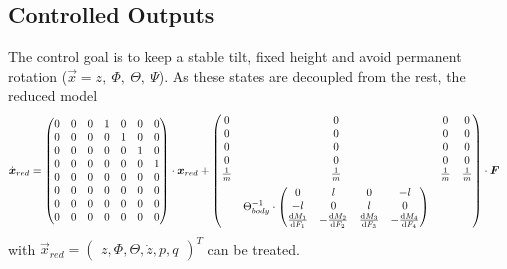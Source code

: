 \subsection{Controlled Outputs}
The control goal is to keep a stable tilt, fixed height and avoid permanent rotation ($\vec{x}=z,~\Phi,~\Theta,~\Psi$). As these states are decoupled from the rest, the reduced model 
\begin{align}
	\dot{\boldsymbol{x}}_{red} &= \begin{pmatrix} 
		0 & 0 & 0 & 1 & 0 & 0 & 0 \\
		0 & 0 & 0 & 0 & 1 & 0 & 0 \\
		0 & 0 & 0 & 0 & 0 & 1 & 0 \\
		0 & 0 & 0 & 0 & 0 & 0 & 1 \\
		0 & 0 & 0 & 0 & 0 & 0 & 0 \\
		0 & 0 & 0 & 0 & 0 & 0 & 0 \\
		0 & 0 & 0 & 0 & 0 & 0 & 0 \\
		0 & 0 & 0 & 0 & 0 & 0 & 0 
	\end{pmatrix} \cdot \boldsymbol{x}_{red} + \begin{pmatrix}
	 	0 & 0 & 0 & 0 \\
	 	0 & 0 & 0 & 0 \\
	 	0 & 0 & 0 & 0 \\
	 	0 & 0 & 0 & 0 \\
	 	\frac{1}{m} & \frac{1}{m} & \frac{1}{m} & \frac{1}{m} \\[0.5em]
	 	& \Theta_{body}^{-1} \cdot \begin{pmatrix}
		 	0 & l & 0 & -l \\
		 	-l & 0 &  l & 0 \\
		 	\frac{\text{d}M_1}{\text{d}F_1} & -\frac{\text{d}M_2}{\text{d}F_2} & \frac{\text{d}M_3}{\text{d}F_3} & -\frac{\text{d}M_4}{\text{d}F_4}
	 	\end{pmatrix}
	 \end{pmatrix} \cdot \boldsymbol{F} \label{eq:mdl_linearized}
\end{align}
with $\vec{x}_{red} = \begin{pmatrix} z, \Phi, \Theta, \dot{z}, p, q \end{pmatrix}^T$ can be treated.
\clearpage

